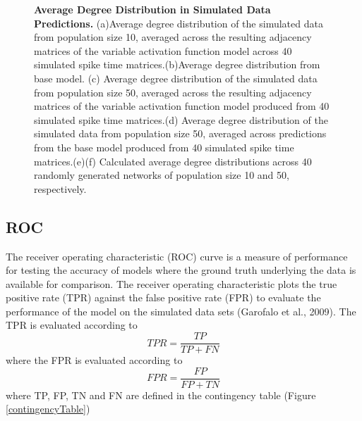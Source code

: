 \documentclass[11pt,titlepage]{article}
\begin{document}
\begin{figure}[H]
\caption[Average Degree Distribution in Simulated Data Predictions]{\textbf{Average Degree Distribution in Simulated Data Predictions.} (a)Average degree distribution of the simulated data from population size 10, averaged across the resulting adjacency matrices of the variable activation function model across 40 simulated spike time matrices.(b)Average degree distribution from base model. (c) Average degree distribution of the simulated data from population size 50, averaged across the resulting adjacency matrices of the variable activation function model produced from 40 simulated spike time matrices.(d) Average degree distribution of the simulated data from population size 50, averaged across predictions from the base model produced from 40 simulated spike time matrices.(e)(f) Calculated average degree distributions across 40 randomly generated networks of population size 10 and 50, respectively.}
\label{fig:DD}
\end{figure}

\subsection{ROC}
The receiver operating characteristic (ROC) curve is a measure of performance for testing the accuracy of models where the ground truth underlying the data is available for comparison. The receiver operating characteristic plots the true positive rate (TPR) against the false positive rate (FPR) to evaluate the performance of the model on the simulated data sets (Garofalo et al., 2009). The TPR is evaluated according to $$TPR = \frac{TP}{TP + FN}$$ where the FPR is evaluated according to $$FPR = \frac{FP}{FP + TN}$$ where TP, FP, TN and FN are defined in the contingency table (Figure \ref{contingencyTable})
\end{document}
